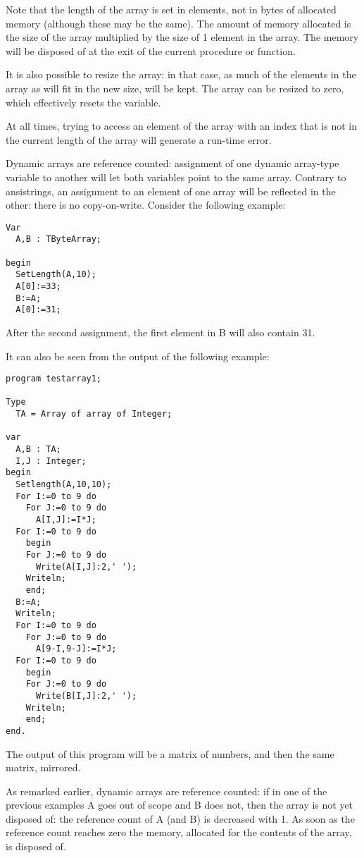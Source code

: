 Note that the length of the array is set in elements, not in bytes of
allocated memory (although these may be the same). The amount of
memory allocated is the size of the array multiplied by the size of
1 element in the array. The memory will be disposed of at the exit of the
current procedure or function.

It is also possible to resize the array: in that case, as much of the
elements in the array as will fit in the new size, will be kept. The array
can be resized to zero, which effectively resets the variable.

At all times, trying to access an element of the array with an index
that is not in the current length of the array will generate a run-time
error.

Dynamic arrays are reference counted: assignment of one dynamic array-type
variable to another will let both variables point to the same array.
Contrary to ansistrings, an assignment to an element of one array will
be reflected in the other: there is no copy-on-write. Consider the following
example:
\begin{verbatim}
Var
  A,B : TByteArray;

begin
  SetLength(A,10);
  A[0]:=33;
  B:=A;
  A[0]:=31;
\end{verbatim}
After the second assignment, the first element in B will also contain 31.

It can also be seen from the output of the following example:
\begin{verbatim}
program testarray1;

Type
  TA = Array of array of Integer;

var
  A,B : TA;
  I,J : Integer;
begin
  Setlength(A,10,10);
  For I:=0 to 9 do
    For J:=0 to 9 do
      A[I,J]:=I*J;
  For I:=0 to 9 do
    begin
    For J:=0 to 9 do
      Write(A[I,J]:2,' ');
    Writeln;
    end;
  B:=A;
  Writeln;
  For I:=0 to 9 do
    For J:=0 to 9 do
      A[9-I,9-J]:=I*J;
  For I:=0 to 9 do
    begin
    For J:=0 to 9 do
      Write(B[I,J]:2,' ');
    Writeln;
    end;
end.
\end{verbatim}
The output of this program will be a matrix of numbers, and then the same matrix, mirrored.

As remarked earlier, dynamic arrays are reference counted: if in one of the previous examples A
goes out of  scope and B does not, then the array is not yet disposed of: the
reference count of A (and B) is decreased with 1. As soon as the reference
count reaches zero the memory, allocated for the contents of the array, is disposed of.

